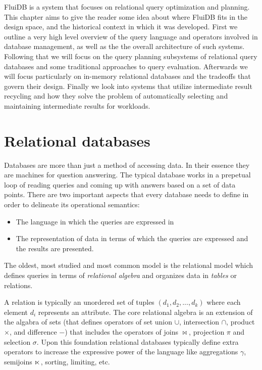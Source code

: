 
FluiDB is a system that focuses on relational query optimization and
planning. This chapter aims to give the reader some idea about where
FluiDB fits in the design space, and the historical context in which
it was developed.  First we outline a very high level overview of the
query language and operators involved in database management, as well
as the the overall architecture of such systems. Following that we
will focus on the query planning subsystems of relational query
databases and some traditional approaches to query
evaluation. Afterwards we will focus particularly on in-memory
relational databases and the tradeoffs that govern their
design. Finally we look into systems that utilize intermediate result
recycling and how they solve the problem of automatically selecting
and maintaining intermediate results for workloads.

\section{Relational databases}
\label{sec:org5af5e27}
Databases are more than just a method of accessing data. In their
essence they are machines for question answering. The typical database
works in a prepetual loop of reading queries and coming up with
answers based on a set of data points. There are two important aspects
that every database needs to define in order to delineate its
operational semantics:

\begin{itemize}
\item The language in which the queries are expressed in
\item The representation of data in terms of which the queries are
  expressed and the results are presented.
\end{itemize}

The oldest, most studied and most common model is the relational model
which defines queries in terms of \emph{relational algebra} and organizes
data in \emph{tables} or relations.

A relation is typically an unordered set of tuples
\((d_1,d_2,...,d_k)\) where each element \(d_i\) represents an
attribute. The core relational algebra is an extension of the algabra
of sets (that defines operators of set union \(\cup\), intersection
\(\cap\), product \(\times\), and difference \(-\)) that includes the
operators of joins \(\Join\), projection \(\pi\) and selection
\(\sigma\). Upon this foundation relational databases typically define
extra operators to increase the expressive power of the language like
aggregations \(\gamma\), semijoins \(\ltimes\), sorting, limiting, etc.

